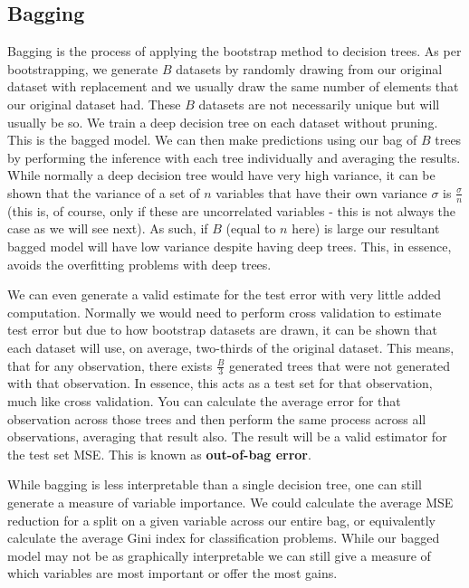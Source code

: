 \subsection{Bagging}

Bagging is the process of applying the bootstrap method to decision trees. As per bootstrapping, we generate $B$ datasets by randomly drawing from our original dataset with replacement and we usually draw the same number of elements that our original dataset had. These $B$ datasets are not necessarily unique but will usually be so. We train a deep decision tree on each dataset without pruning. This is the bagged model. We can then make predictions using our bag of $B$ trees by performing the inference with each tree individually and averaging the results. While normally a deep decision tree would have very high variance, it can be shown that the variance of a set of $n$ variables that have their own variance $\sigma$ is $\frac{\sigma}{n}$ (this is, of course, only if these are uncorrelated variables - this is not always the case as we will see next). As such, if $B$ (equal to $n$ here) is large our resultant bagged model will have low variance despite having deep trees. This, in essence, avoids the overfitting problems with deep trees.

We can even generate a valid estimate for the test error with very little added computation. Normally we would need to perform cross validation to estimate test error but due to how bootstrap datasets are drawn, it can be shown that each dataset will use, on average, two-thirds of the original dataset. This means, that for any observation, there exists $\frac{B}{3}$ generated trees that were not generated with that observation. In essence, this acts as a test set for that observation, much like cross validation. You can calculate the average error for that observation across those trees and then perform the same process across all observations, averaging that result also. The result will be a valid estimator for the test set MSE. This is known as \textbf{out-of-bag error}.

While bagging is less interpretable than a single decision tree, one can still generate a measure of variable importance. We could calculate the average MSE reduction for a split on a given variable across our entire bag, or equivalently calculate the average Gini index for classification problems. While our bagged model may not be as graphically interpretable we can still give a measure of which variables are most important or offer the most gains.
